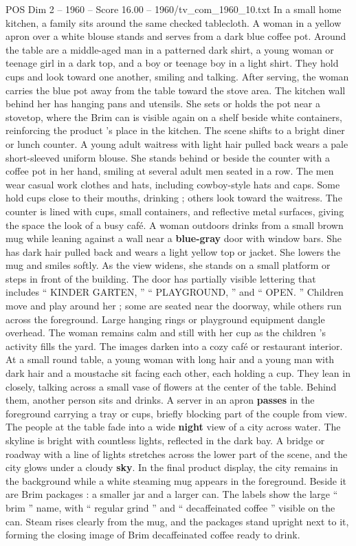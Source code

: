 \begin{textsample}{POS Dim 2 – 1960 – Score 16.00 – 1960/tv\_com\_1960\_10.txt}
In a small home kitchen, a family sits around the same checked tablecloth.
A woman in a yellow apron over a white blouse stands and serves from a dark blue coffee pot.
Around the table are a middle-aged man in a patterned dark shirt, a young woman or teenage girl in a dark top, and a boy or teenage boy in a light shirt.
They hold cups and look toward one another, smiling and talking.
After serving, the woman carries the blue pot away from the table toward the stove area.
The kitchen wall behind her has hanging pans and utensils.
She sets or holds the pot near a stovetop, where the Brim can is visible again on a shelf beside white containers, reinforcing the product ’s place in the kitchen.
The scene shifts to a bright diner or lunch counter.
A young adult waitress with light hair pulled back wears a pale short-sleeved uniform blouse.
She stands behind or beside the counter with a coffee pot in her hand, smiling at several adult men seated in a row.
The men wear casual work clothes and hats, including cowboy-style hats and caps.
Some hold cups close to their mouths, drinking ; others look toward the waitress.
The counter is lined with cups, small containers, and reflective metal surfaces, giving the space the look of a busy café.
A woman outdoors drinks from a small brown mug while leaning against a wall near a \textbf{blue-gray} door with window bars.
She has dark hair pulled back and wears a light yellow top or jacket.
She lowers the mug and smiles softly.
As the view widens, she stands on a small platform or steps in front of the building.
The door has partially visible lettering that includes “ KINDER GARTEN, ” “ PLAYGROUND, ” and “ OPEN. ” Children move and play around her ; some are seated near the doorway, while others run across the foreground.
Large hanging rings or playground equipment dangle overhead.
The woman remains calm and still with her cup as the children ’s activity fills the yard.
The images darken into a cozy café or restaurant interior.
At a small round table, a young woman with long hair and a young man with dark hair and a moustache sit facing each other, each holding a cup.
They lean in closely, talking across a small vase of flowers at the center of the table.
Behind them, another person sits and drinks.
A server in an apron \textbf{passes} in the foreground carrying a tray or cups, briefly blocking part of the couple from view.
The people at the table fade into a wide \textbf{night} view of a city across water.
The skyline is bright with countless lights, reflected in the dark bay.
A bridge or roadway with a line of lights stretches across the lower part of the scene, and the city glows under a cloudy \textbf{sky}.
In the final product display, the city remains in the background while a white steaming mug appears in the foreground.
Beside it are Brim packages : a smaller jar and a larger can.
The labels show the large “ brim ” name, with “ regular grind ” and “ decaffeinated coffee ” visible on the can.
Steam rises clearly from the mug, and the packages stand upright next to it, forming the closing image of Brim decaffeinated coffee ready to drink.

\end{textsample}

